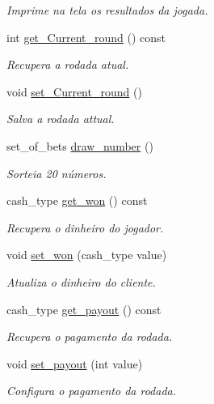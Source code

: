 \begin{DoxyCompactItemize}
\begin{DoxyCompactList}\small\item\em Imprime na tela os resultados da jogada. \end{DoxyCompactList}\item 
int \hyperlink{classKeno_1_1KenoManager_a4eb6561ea1201a9f5e6afcf655ea14a6}{get\+\_\+\+Current\+\_\+round} () const 
\begin{DoxyCompactList}\small\item\em Recupera a rodada atual. \end{DoxyCompactList}\item 
void \hyperlink{classKeno_1_1KenoManager_adbe43f8f493c4e762629849578f6a4c9}{set\+\_\+\+Current\+\_\+round} ()
\begin{DoxyCompactList}\small\item\em Salva a rodada attual. \end{DoxyCompactList}\item 
set\+\_\+of\+\_\+bets \hyperlink{classKeno_1_1KenoManager_af4346ca265825b8ae185d719f6b1734e}{draw\+\_\+number} ()
\begin{DoxyCompactList}\small\item\em Sorteia 20 números. \end{DoxyCompactList}\item 
cash\+\_\+type \hyperlink{classKeno_1_1KenoManager_a43492c15736249994627739019627299}{get\+\_\+won} () const 
\begin{DoxyCompactList}\small\item\em Recupera o dinheiro do jogador. \end{DoxyCompactList}\item 
void \hyperlink{classKeno_1_1KenoManager_abeadb4830bc691ddd7222130c3bf76d4}{set\+\_\+won} (cash\+\_\+type value)
\begin{DoxyCompactList}\small\item\em Atualiza o dinheiro do cliente. \end{DoxyCompactList}\item 
cash\+\_\+type \hyperlink{classKeno_1_1KenoManager_a7932278860e76a7688aa620d1eaee88f}{get\+\_\+payout} () const 
\begin{DoxyCompactList}\small\item\em Recupera o pagamento da rodada. \end{DoxyCompactList}\item 
void \hyperlink{classKeno_1_1KenoManager_a9690192c68cb187301441918ae4eb36c}{set\+\_\+payout} (int value)
\begin{DoxyCompactList}\small\item\em Configura o pagamento da rodada. \end{DoxyCompactList}\item 

\end{DoxyCompactItemize}
